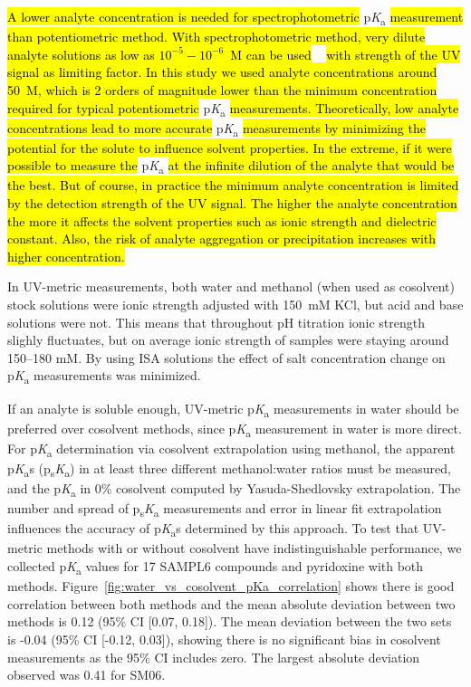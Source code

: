 \documentclass[9pt,lineno]{elife}
\newcommand{\pKa}{p\textit{K}\textsubscript{a}}
\newcommand{\psKa}{p\textsubscript{s}\textit{K}\textsubscript{a}}
\begin{document}
\hl{A lower analyte concentration is needed for spectrophotometric} \pKa{} \hl{measurement than potentiometric method. With spectrophotometric method, very dilute analyte solutions as low as $10^{-5}-10^{-6}$~M can be used} ~\citep{tam_multi-wavelength_2001} \hl{with strength of the UV signal as limiting factor. In this study we used analyte concentrations around 50~\micro{}M, which is 2 orders of magnitude lower than the minimum concentration required for typical potentiometric} \pKa{} \hl{measurements. Theoretically, low analyte concentrations lead to more accurate} \pKa{} \hl{measurements by minimizing the potential for the solute to influence solvent properties. In the extreme, if it were possible to measure the} \pKa{} \hl{at the infinite dilution of the analyte that would be the best. But of course, in practice the minimum analyte concentration is limited by the detection strength of the UV signal. The higher the analyte concentration the more it affects the solvent properties such as ionic strength and dielectric constant. Also, the risk of analyte aggregation or precipitation increases with higher concentration.}

In UV-metric measurements, both water and methanol (when used as cosolvent) stock solutions were ionic strength adjusted with 150~mM KCl, but acid and base solutions were not. This means that throughout pH titration ionic strength slighly fluctuates, but on average ionic strength of samples were staying around 150--180 mM. 
By using ISA solutions the effect of salt concentration change on \pKa{} measurements was minimized.

If an analyte is soluble enough, UV-metric \pKa{} measurements in water should be preferred over cosolvent methods, since \pKa{} measurement in water is more direct. 
For \pKa{} determination via cosolvent extrapolation using methanol, the apparent \pKa{}s (\psKa) in at least three different methanol:water ratios must be measured, and the \pKa{} in 0\% cosolvent computed by Yasuda-Shedlovsky extrapolation. 
The number and spread of \psKa{} measurements and error in linear fit extrapolation influences the accuracy of \pKa{}s determined by this approach. 
To test that UV-metric methods with or without cosolvent have indistinguishable performance, we collected \pKa{} values for 17 SAMPL6 compounds and pyridoxine with both methods. 
Figure~\ref{fig:water_vs_cosolvent_pKa_correlation} shows there is good correlation between both methods and the mean absolute deviation between two methods is 0.12 (95\% CI [0.07, 0.18]). 
The mean deviation between the two sets is -0.04 (95\% CI [-0.12, 0.03]), showing there is no significant bias in cosolvent measurements as the 95\% CI includes zero. 
The largest absolute deviation observed was 0.41 for SM06. 
\end{document}
